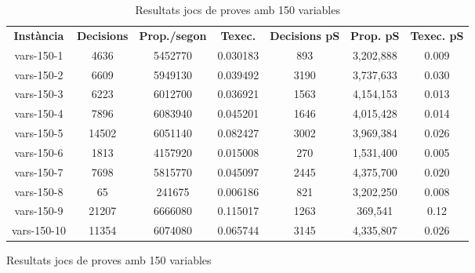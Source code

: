 \begin{figure}[H]
	\centering
	\begin{table}[H]
		\begin{tabular}{ccccccc}
			\rowcolor[HTML]{C0C0C0} 
			{\color[HTML]{000000} \textbf{Instància}} & {\color[HTML]{000000} \textbf{Decisions}} & {\color[HTML]{000000} \textbf{Prop./segon}} & {\color[HTML]{000000} \textbf{Texec.}} & {\color[HTML]{000000} \textbf{Decisions pS}}& {\color[HTML]{000000} \textbf{Prop. pS}}& {\color[HTML]{000000} \textbf{Texec. pS}} \\
			vars-150-1 & 4636 & 5452770 & 0.030183 & 893 & 3,202,888 & 0.009\\
			vars-150-2 & 6609 & 5949130 & 0.039492 & 3190 & 3,737,633 & 0.030\\
			vars-150-3 & 6223 & 6012700 & 0.036921 & 1563 & 4,154,153 & 0.013 \\
			vars-150-4 & 7896 & 6083940 & 0.045201 & 1646 & 4,015,428 & 0.014\\
			vars-150-5 & 14502 & 6051140 & 0.082427 & 3002 & 3,969,384 & 0.026\\
			vars-150-6 & 1813 & 4157920 & 0.015008 & 270 & 1,531,400 & 0.005\\
			vars-150-7 & 7698 & 5815770 & 0.045097 & 2445 & 4,375,700 & 0.020\\
			vars-150-8 & 65 & 241675 & 0.006186 & 821 & 3,202,250 & 0.008\\
			vars-150-9 & 21207 & 6666080 & 0.115017 & 1263 & 369,541 & 0.12\\
			vars-150-10 & 11354 & 6074080 & 0.065744 & 3145 & 4,335,807 & 0.026 \\                               
		\end{tabular}
			\caption{Resultats jocs de proves amb 150 variables}
	\end{table}
	\label{fig:my_label2}
\end{figure}

